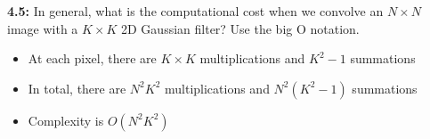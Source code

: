 \documentclass[12pt]{article}
\begin{document}
\textbf{4.5:} In general, what is the computational cost when we convolve an $N
\times N$ image with a $K \times K$ 2D Gaussian filter? Use the big O notation.
\begin{itemize}
    \item At each pixel, there are $K \times K$ multiplications and $K^2 - 1$ summations
    \item In total, there are $N^2K^2$ multiplications and $N^2(K^2 - 1)$
    summations 
    \item Complexity is $O(N^2 K^2)$
\end{itemize}
\end{document}
